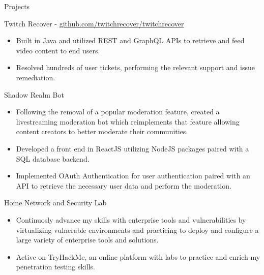 \documentclass{article}
\newlength{\tabin}
\newlength{\secsep}
\newcommand{\lineunder}{\vspace*{-8pt} \\ \hspace*{-6pt} \hrulefill \\ \vspace*{-15pt}}
\newenvironment{tabbedsection}[1]{
  \begin{list}{}{
      \setlength{\itemsep}{0pt}
      \setlength{\labelsep}{0pt}
      \setlength{\labelwidth}{0pt}
      \setlength{\leftmargin}{\tabin}
      \setlength{\rightmargin}{\tabin}
      \setlength{\listparindent}{0pt}
      \setlength{\parsep}{0pt}
      \setlength{\parskip}{0pt}
      \setlength{\partopsep}{0pt}
      \setlength{\topsep}{#1}
    }
  \item[]
}{\end{list}}
\newenvironment{resume_section}[1]{
  \filbreak
  \vspace{2\secsep}
  \textsc{\color{blue}\large#1}
  \lineunder
  \begin{tabbedsection}{\secsep}
}{\end{tabbedsection}}
\newenvironment{resume_subsection}[2][]{
  \textbf{\color{BlueViolet}#2} \hfill {\normalsize #1} \hspace{-5em} 
  \begin{tabbedsection}{0.5\secsep}
}{\end{tabbedsection}}
\newenvironment{subitems}{
  \renewcommand{\labelitemi}{-}
  \begin{itemize}
      \setlength{\labelsep}{1em}
}{\end{itemize}}
\begin{document}
\begin{resume_section}{Projects}
\begin{resume_subsection}{Twitch Recover - \faGithub \hspace{0.01cm} \href{https://github.com/twitchrecover/twitchrecover}{github.com/twitchrecover/twitchrecover}}
\begin{subitems}
    			\item Built in Java and utilized REST and GraphQL APIs to retrieve and feed video content to end users.
    			\item Resolved hundreds of user tickets, performing the relevant support and issue remediation.
		\end{subitems}
	\end{resume_subsection}
	\vspace{2\secsep}
	\begin{resume_subsection}{Shadow Realm Bot}
		\begin{subitems}
            \item Following the removal of a popular moderation feature, created a livestreaming moderation bot which reimplements that feature allowing content creators to better moderate their communities. 
			\item Developed a front end in ReactJS utilizing NodeJS packages paired with a SQL database backend.
			\item Implemented OAuth Authentication for user authentication paired with an API to retrieve the necessary user data and perform the moderation.
		\end{subitems}
	\end{resume_subsection}
	\vspace{2\secsep}
  	\begin{resume_subsection}{Home Network and Security Lab}
  		\begin{subitems}
            \item Continuosly advance my skills with enterprise tools and vulnerabilities by virtualizing vulnerable environments and practicing to deploy and configure a large variety of enterprise tools and solutions. 
  			\item Active on TryHackMe, an online platform with labs to practice and enrich my penetration testing skills.
  		\end{subitems}
  	\end{resume_subsection}
\end{resume_section}

\vspace{2\secsep}
\end{document}
